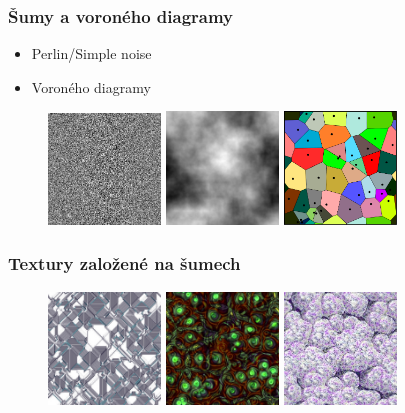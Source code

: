 \begin{frame}
\frametitle{Šumy a voroného diagramy}
	\begin{itemize}
		\item Perlin/Simple noise
    \item Voroného diagramy
	\end{itemize}
	\begin{figure}[h]
		\includegraphics[width=3cm,keepaspectratio]{pics/procedural/simple_noise}
		\includegraphics[width=3cm,keepaspectratio]{pics/procedural/midpoint_noise}
		\includegraphics[width=3cm,keepaspectratio]{pics/procedural/voronoid}
	\end{figure}
\end{frame}


\begin{frame}
\frametitle{Textury založené na šumech}
	\begin{figure}[h]
		\includegraphics[width=3cm,keepaspectratio]{pics/procedural/tex00.jpg}
		\includegraphics[width=3cm,keepaspectratio]{pics/procedural/tex01.jpg}
		\includegraphics[width=3cm,keepaspectratio]{pics/procedural/tex02.jpg}
	\end{figure}
\end{frame}

